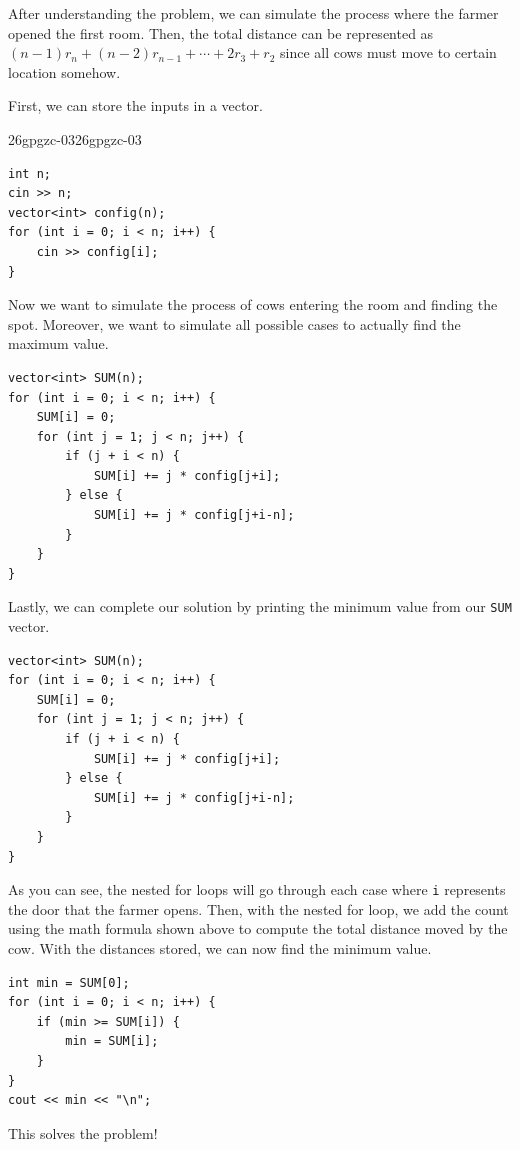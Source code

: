 \documentclass[../../../main.tex]{subfiles}
\begin{document}
\begin{solution}
After understanding the problem, we can simulate the process where
the farmer opened the first room. Then, the total distance can
be represented as $(n-1) r_n + (n-2) r_{n-1} + \cdots + 2 r_3 + r_2$
since all cows must move to certain location somehow.

First, we can store the inputs in a vector.

\begin{cppboxSolution}{26gpgzc-03}{26gpgzc-03}
\begin{lstlisting}[style=cppstyle]
int n;
cin >> n;
vector<int> config(n);
for (int i = 0; i < n; i++) {
    cin >> config[i];
}
\end{lstlisting}
\end{cppboxSolution}

Now we want to simulate the process of cows entering the room
and finding the spot. Moreover, we want to simulate all possible
cases to actually find the maximum value.

\begin{basicboxSolution}
\begin{lstlisting}[style=cppstyle]
vector<int> SUM(n);
for (int i = 0; i < n; i++) {
    SUM[i] = 0;
    for (int j = 1; j < n; j++) {
        if (j + i < n) {
            SUM[i] += j * config[j+i];
        } else {
            SUM[i] += j * config[j+i-n];
        }
    }
}
\end{lstlisting}
\end{basicboxSolution}

Lastly, we can complete our solution by printing the minimum
value from our \verb|SUM| vector.

\begin{basicboxSolution}
\begin{lstlisting}[style=cppstyle]
vector<int> SUM(n);
for (int i = 0; i < n; i++) {
    SUM[i] = 0;
    for (int j = 1; j < n; j++) {
        if (j + i < n) {
            SUM[i] += j * config[j+i];
        } else {
            SUM[i] += j * config[j+i-n];
        }
    }
}
\end{lstlisting}
\end{basicboxSolution}

As you can see, the nested for loops will go through each case
where \verb|i| represents the door that the farmer opens.
Then, with the nested for loop, we add the count using the
math formula shown above to compute the total distance moved
by the cow. With the distances stored, we can now find the
minimum value.

\begin{basicboxSolution}
\begin{lstlisting}[style=cppstyle]
int min = SUM[0];
for (int i = 0; i < n; i++) {
    if (min >= SUM[i]) {
        min = SUM[i];
    }
}
cout << min << "\n";
\end{lstlisting}
\end{basicboxSolution}

This solves the problem!
\end{solution}
\end{document}
